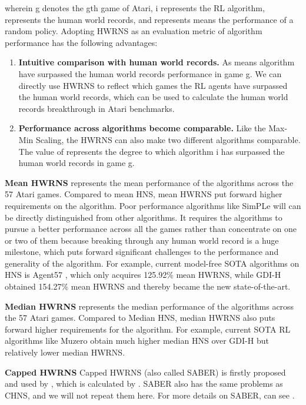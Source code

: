 \documentclass[nohyperref]{article}
\theoremstyle{plain}
\begin{document}
wherein g denotes the gth game of Atari, i represents the RL algorithm,  represents the human world records, and  represents means the performance of a random policy. Adopting HWRNS as an evaluation metric of algorithm performance has the following advantages:

\begin{enumerate}
    \item \textbf{Intuitive comparison with human world records.} As  means algorithm  have surpassed the human world records performance in game g. We can directly use HWRNS to reflect which games the RL agents have surpassed the human world records, which can be used to calculate the human world records breakthrough in Atari benchmarks.
    \item \textbf{Performance across algorithms become comparable.} Like the Max-Min Scaling, the HWRNS can also make two different algorithms comparable. The value of  represents the degree to which algorithm i has surpassed the human world records in game g.
\end{enumerate}


\textbf{Mean HWRNS} represents the mean performance of the algorithms across the 57 Atari games. Compared to mean HNS, mean HWRNS put forward higher requirements on the algorithm. Poor performance algorithms like SimPLe \citep{modelbasedatari} will can be directly distinguished from other algorithms. It requires the algorithms to pursue a better performance across all the games rather than concentrate on one or two of them because breaking through any human world record is a huge milestone, which puts forward significant challenges to the performance and generality of the algorithm. For example, current model-free SOTA algorithms on HNS is Agent57 \citep{agent57}, which only acquires 125.92\% mean HWRNS, while GDI-H obtained 154.27\% mean HWRNS and thereby became the new state-of-the-art.

\textbf{Median HWRNS} represents the median performance of the algorithms across the 57 Atari games. Compared to Median HNS, median HWRNS also puts forward higher requirements for the algorithm. For example, current SOTA RL algorithms like Muzero \citep{muzero} obtain much higher median HNS over GDI-H but relatively lower median HWRNS.

\textbf{Capped HWRNS} Capped HWRNS (also called SABER) is firstly proposed and used by \citep{atarihuman}, which is calculated by . SABER also has the same problems as CHNS, and we will not repeat them here. For more details on SABER, can see \citep{atarihuman}.
\end{document}
